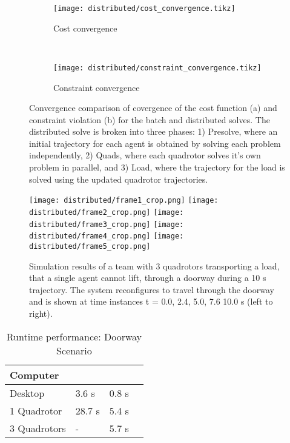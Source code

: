 \documentclass[../root.tex]{subfiles}
\begin{document}
\begin{figure*}[t]
	\centering
	\begin{subfigure}{0.485\textwidth}
		\texttt{[image: distributed/cost\_convergence.tikz]}
		\caption{Cost convergence}
		\label{fig:cost_convergence}
	\end{subfigure}
	~
	\begin{subfigure}{0.485\textwidth}
		\texttt{[image: distributed/constraint\_convergence.tikz]}
		\caption{Constraint convergence}
		\label{fig:constraint_convergence}
	\end{subfigure}
	\caption{Convergence comparison of covergence of the cost function (a)
	and constraint violation (b) for the batch and distributed solves. The
	distributed solve is broken into three phases: 1) Presolve, where an
	initial trajectory for each agent is obtained by solving each problem
	independently, 2) Quads, where each quadrotor solves it's own problem in
	parallel, and 3) Load, where the trajectory for the load is solved using
	the updated quadrotor trajectories.}
\end{figure*}

\begin{figure}[t]
	\centering
	\texttt{[image: distributed/frame1\_crop.png]}
	\endminipage
	\texttt{[image: distributed/frame2\_crop.png]}
	\endminipage
	\texttt{[image: distributed/frame3\_crop.png]}
	\endminipage
	\texttt{[image: distributed/frame4\_crop.png]}
	\endminipage
	\texttt{[image: distributed/frame5\_crop.png]}
	\endminipage
	\caption{Simulation results of a team with 3 quadrotors transporting a
	load, that a single agent cannot lift, through a doorway during a 10 s
	trajectory. The system reconfigures to travel through the doorway and is
	shown at time instances t = 0.0, 2.4, 5.0, 7.6 10.0 s (left to right).}
	\label{composite}
\end{figure}

\begin{table}
	\centering
	\caption{Runtime performance: Doorway Scenario}
	\begin{tabular}{llll}
		\toprule
		\textbf{Computer} &
		\specialcellbold{Batch} &
		\specialcellbold{Parallel} \\
		\midrule
		Desktop & 3.6 s  & 0.8 s \\
		1 Quadrotor & 28.7 s & 5.4 s \\
		3 Quadrotors & - &  5.7 s \\
		\toprule
	\end{tabular}
	\label{tab:door_timing}
\end{table}
\end{document}

